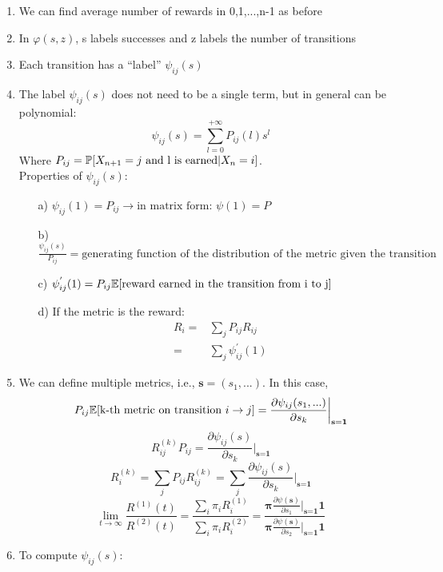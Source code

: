 \begin{enumerate}
	\item We can find average number of rewards in 0,1,...,n-1 as before
	\item In $\varphi(s,z)$, s labels successes and z labels the number of transitions
	\item Each transition has a ``label'' $\psi_{ij}(s)$
	\item The label $\psi_{ij}(s)$ does not need to be a single term, but in general can be polynomial: $$\psi_{ij}(s) = \sum\limits_{l=0}^{+\infty} P_{ij}(l)s^l$$
				Where $P_{ij} = \mathbb{P}[X_{n+1}=j\text{ and l is earned}| X_n = i]$.\\
				Properties of $\psi_{ij}(s)$:
				\begin{itemize}
					\item[a)] $\psi_{ij}(1)=P_{ij} \rightarrow \text{in matrix form: } \psi(1) = P$
					\item[b)] $\frac{\psi_{ij}(s)}{P_{ij}}=\text{generating function of the distribution of the metric given the transition}$
					\item[c)] $\psi_{ij}^{'}(1)=P_{ij}\mathbb{E}[\text{reward earned in the transition from i to j}] $
					\item[d)] If the metric is the reward:
								\begin{equation}
									\begin{split}
										R_i =& \sum_j P_{ij}R_{ij} \\
										    =& \sum_j \psi_{ij}^{'}(1)
									\end{split}
								\end{equation}
				\end{itemize}
	\item We can define multiple metrics, i.e., $\textbf{s} = (s_1,...)$. In this case,
				$$P_{ij}\mathbb{E}[\text{k-th metric on transition } i \rightarrow j] = \frac{\partial \psi_{ij}(s_1,...)}{\partial s_k}\bigg|_{\textbf{s}=\textbf{1}} $$
				$$R_{ij}^{(k)}P_{ij}=  \frac{\partial \psi_{ij}(s)}{\partial s_k}\bigg|_{\textbf{s}=\textbf{1}}$$
				$$R_i^{(k)} = \sum_j P_{ij}R_{ij}^{(k)} = \sum_j \frac{\partial \psi_{ij}(s)}{\partial s_k}\bigg|_{\textbf{s}=\textbf{1}}$$
				$$ \lim_{t \to \infty}\frac{R^{(1)}(t)}{R^{(2)}(t)}=\frac{\sum_i \pi_i R_i^{(1)}}{\sum_i \pi_i R_i^{(2)}}= \frac{\mathbf{\pi} \frac{\partial \psi(\mathbf{s})}{\partial s_1}\bigg|_{\textbf{s}=\textbf{1}}\textbf{1}}{\mathbf{\pi}\frac{\partial \psi(\mathbf{s})}{\partial s_2}\bigg|_{\textbf{s}=\textbf{1}}\textbf{1}}$$
	\item To compute $\psi_{ij}(s)$:

\end{enumerate}
